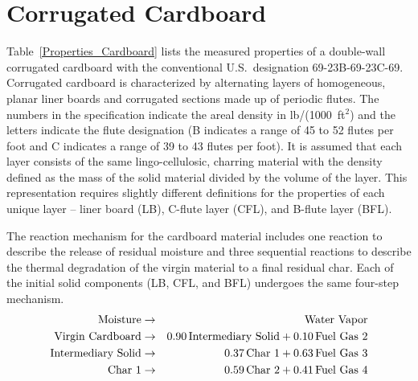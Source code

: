 \section{Corrugated Cardboard}
\label{Cardboard}

Table~\ref{Properties_Cardboard} lists the measured properties of a double-wall corrugated cardboard with the conventional U.S.~designation 69-23B-69-23C-69. Corrugated cardboard is characterized by alternating layers of homogeneous, planar liner boards and corrugated sections made up of periodic flutes. The numbers in the specification indicate the areal density in lb/(1000~ft$^2$) and the letters indicate the flute designation (B indicates a range of 45 to 52 flutes per foot and C indicates a range of 39 to 43 flutes per foot). It is assumed that each layer consists of the same lingo-cellulosic, charring material with the density defined as the mass of the solid material divided by the volume of the layer. This representation requires slightly different definitions for the properties of each unique layer -- liner board (LB), C-flute layer (CFL), and B-flute layer (BFL).

The reaction mechanism for the cardboard material includes one reaction to describe the release of residual moisture and three sequential reactions to describe the thermal degradation of the virgin material to a final residual char. Each of the initial solid components (LB, CFL, and BFL) undergoes the same four-step mechanism.
\begin{eqnarray}
   \hbox{Moisture}            &\to& \hbox{Water Vapor}  \\
   \hbox{Virgin Cardboard}    &\to& 0.90 \, \hbox{Intermediary Solid} + 0.10 \, \hbox{Fuel Gas 2}  \\
   \hbox{Intermediary Solid}  &\to& 0.37 \, \hbox{Char 1}             + 0.63 \, \hbox{Fuel Gas 3}  \\
   \hbox{Char 1}              &\to& 0.59 \, \hbox{Char 2}             + 0.41 \, \hbox{Fuel Gas 4}
\end{eqnarray}

